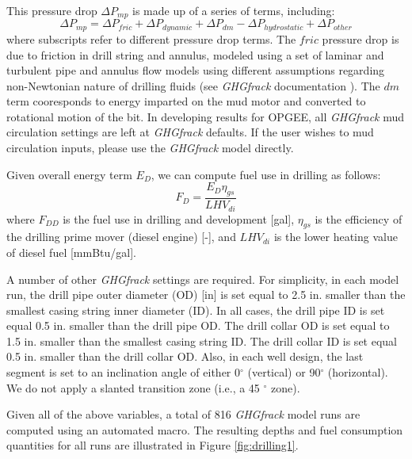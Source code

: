 \documentclass[11pt]{report}
\begin{document}
This pressure drop $\Delta P_{mp}$ is made up of a series of terms, including:
\begin{equation}
\Delta P_{mp} = \Delta P_{fric} + \Delta P_{dynamic} + \Delta P_{dm} - \Delta P_{hydrostatic} + \Delta P_{other}
\end{equation}
where subscripts refer to different pressure drop terms.  The $fric$ pressure drop is due to friction in drill string and annulus, modeled using a set of laminar and turbulent pipe and annulus flow models using different assumptions regarding non-Newtonian nature of drilling fluids (see \emph{GHGfrack} documentation \cite{Vafi2016a, Vafi2016b}).  The $dm$ term cooresponds to energy imparted on the mud motor and converted to rotational motion of the bit.  In developing results for OPGEE, all \emph{GHGfrack} mud circulation settings are left at \emph{GHGfrack} defaults. If the user wishes to mud circulation inputs, please use the \emph{GHGfrack} model directly. 

Given overall energy term $E_{D}$, we can compute fuel use in drilling as follows:
\begin{equation}
F_{D} = \frac{E_{D} \eta_{gs}}{LHV_{di}}
\end{equation}
where $F_{DD}$ is the fuel use in drilling and development [gal], $\eta_{gs}$ is the efficiency of the drilling prime mover (diesel engine) [-], and $LHV_{di}$ is the lower heating value of diesel fuel [mmBtu/gal].

A number of other \emph{GHGfrack} settings are required. For simplicity, in each model run, the drill pipe outer diameter (OD) [in] is set equal to 2.5 in. smaller than the smallest casing string inner diameter (ID).  In all cases, the drill pipe ID is set equal 0.5 in. smaller than the drill pipe OD.  The drill collar OD is set equal to 1.5 in. smaller than the smallest casing string ID.  The drill collar ID is set equal 0.5 in. smaller than the drill collar OD.  Also, in each well design, the last segment is set to an inclination angle of either 0$^\circ$ (vertical) or 90$^\circ$ (horizontal).  We do not apply a slanted transition zone (i.e., a 45 $^\circ$ zone).   

Given all of the above variables, a total of 816 \emph{GHGfrack} model runs are computed using an automated macro.  The resulting depths and fuel consumption quantities for all runs are illustrated in Figure \ref{fig:drilling1}.  
\end{document}
